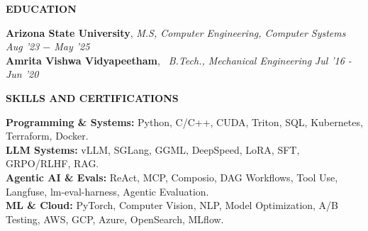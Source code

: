 \documentclass[10pt,a4]{article}
\def\hrulefill{\leavevmode\leaders\hrule height 1pt\hfill\kern0pt}		%
\begin{document}
{    \vspace{-2mm}


\vspace{0.25mm}
\begin{flushleft}
	{\Large \textbf{EDUCATION}} %

    	\hspace{1.5mm} \textbf{\large Arizona State University}, \textit{M.S, Computer Engineering, Computer Systems}  \hfill \textit{Aug '23 $-$ May '25}	\\

        \hspace{1.5mm} \textbf{\large Amrita Vishwa Vidyapeetham}, \textit{\ B.Tech., Mechanical Engineering} \hfill \textit{ Jul '16 - Jun '20}	\\

\end{flushleft}

\begin{flushleft}
    {\Large \textbf {SKILLS AND CERTIFICATIONS}}

            \hspace{0.5cm}  \textbf{Programming \& Systems:} Python, C/C++, CUDA, Triton, SQL, Kubernetes, Terraform, Docker. \\
            \hspace{0.5cm}  \textbf{LLM Systems:} vLLM, SGLang, GGML, DeepSpeed, LoRA, SFT, GRPO/RLHF, RAG. \\
            \hspace{0.5cm}  \textbf{Agentic AI \& Evals:} ReAct, MCP, Composio, DAG Workflows, Tool Use, Langfuse, lm-eval-harness, Agentic Evaluation. \\
            \hspace{0.5cm}  \textbf{ML \& Cloud:} PyTorch, Computer Vision, NLP, Model Optimization, A/B Testing, AWS, GCP, Azure, OpenSearch, MLflow. \\


\end{flushleft}}
\end{document}
